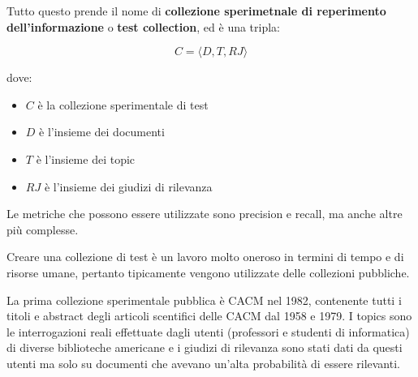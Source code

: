 Tutto questo prende il nome di \textbf{collezione sperimetnale di reperimento dell'informazione} o \textbf{test collection}, ed è una tripla:

$$
C = \langle D, T, RJ\rangle
$$

\noindent dove:
\begin{itemize}
	\item $C$ è la collezione sperimentale di test
	\item $D$ è l'insieme dei documenti
	\item $T$ è l'insieme dei topic
	\item $RJ$ è l'insieme dei giudizi di rilevanza
\end{itemize}

\noindent Le metriche che possono essere utilizzate sono precision e recall, ma anche altre più complesse.

Creare una collezione di test è un lavoro molto oneroso in termini di tempo e di risorse umane, pertanto tipicamente vengono utilizzate delle collezioni pubbliche.

La prima collezione sperimentale pubblica è CACM nel 1982, contenente tutti i titoli e abstract degli articoli scentifici delle CACM dal 1958 e 1979. I topics sono le interrogazioni reali effettuate dagli utenti (professori e studenti di informatica) di diverse biblioteche americane e i giudizi di rilevanza sono stati dati da questi utenti ma solo su documenti che avevano un'alta probabilità di essere rilevanti.













